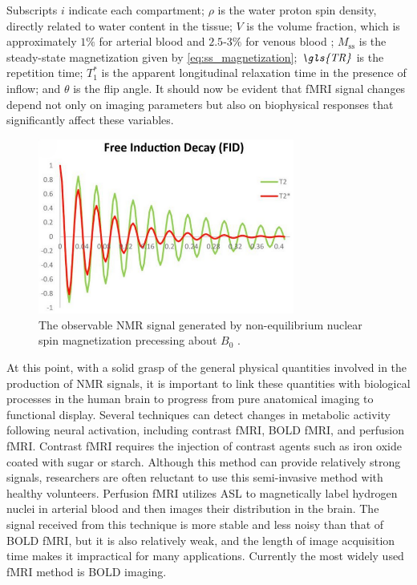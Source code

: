 Subscripts \( i \) indicate each compartment; \( \rho \) is the water proton spin density, directly related to water content in the tissue; \( V \) is the volume fraction, which is approximately \( 1\% \) for arterial blood \cite{Ito2001} and \( 2.5 \text{-} 3\% \) for venous blood \cite{An2002a, An2002b}; \( M_{\text{ss}} \) is the steady-state magnetization given by \autoref{eq:ss_magnetization}; \( \textit{\gls{TR}} \) is the repetition time; \( T_1^* \) is the apparent longitudinal relaxation time in the presence of inflow; and \( \theta \) is the \gls{flip angle}. It should now be evident that \gls{fMRI} signal changes depend not only on imaging parameters but also on biophysical responses that significantly affect these variables.

\begin{figure}[htbp]
    \centering
    \includegraphics[width = 0.75\textwidth]{assets/images/FID.png}
    \caption{The observable \gls{NMR} signal generated by non-equilibrium nuclear spin magnetization precessing about $B_0$ \cite{T2_star_graph}.}
    \label{fig:T2_star}
\end{figure}

At this point, with a solid grasp of the general physical quantities involved in the production of \gls{NMR} signals, it is important to link these quantities with biological processes in the human brain to progress from pure anatomical imaging to functional display. Several techniques can detect changes in metabolic activity following neural activation, including contrast \gls{fMRI}, \gls{BOLD} \gls{fMRI}, and perfusion \gls{fMRI}. Contrast \gls{fMRI} requires the injection of contrast agents such as iron oxide coated with sugar or starch. Although this method can provide relatively strong signals, researchers are often reluctant to use this semi-invasive method with healthy volunteers. Perfusion \gls{fMRI} utilizes \gls{ASL} to magnetically label hydrogen nuclei in arterial blood and then images their distribution in the brain. The signal received from this technique is more stable and less noisy than that of \gls{BOLD} \gls{fMRI}, but it is also relatively weak, and the length of image acquisition time makes it impractical for many applications. Currently the most widely used \gls{fMRI} method is \gls{BOLD} imaging.

